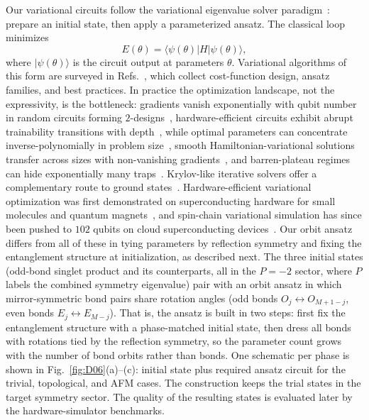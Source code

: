 Our variational circuits follow the variational eigenvalue solver
paradigm~\cite{peruzzo2014variational}: prepare an initial state, then
apply a parameterized ansatz. The classical loop minimizes
\begin{equation}
E(\theta)=\langle\psi(\theta)|H|\psi(\theta)\rangle,
\end{equation}
where $|\psi(\theta)\rangle$ is the circuit output at parameters
$\theta$. Variational algorithms of this form are surveyed in
Refs.~\cite{cerezo2021variational,tilly2022variational}, which collect
cost-function design, ansatz families, and best practices.
In practice the optimization landscape, not the
expressivity, is the bottleneck: gradients vanish exponentially with
qubit number in random circuits forming
$2$-designs~\cite{mcclean2018barren}, hardware-efficient circuits exhibit
abrupt trainability transitions with depth~\cite{campos2021abrupt}, while
optimal parameters can concentrate inverse-polynomially in problem
size~\cite{akshay2021parameter}, smooth Hamiltonian-variational solutions
transfer across sizes with non-vanishing
gradients~\cite{mele2022avoiding}, and barren-plateau regimes can hide
exponentially many traps~\cite{nemkov2025barren}. Krylov-like iterative
solvers offer a complementary route to ground
states~\cite{bharti2021iterative}. Hardware-efficient variational
optimization was first demonstrated on superconducting hardware for
small molecules and quantum
magnets~\cite{kandala2017hardware}, and spin-chain variational simulation
has since been pushed to $102$ qubits on cloud superconducting
devices~\cite{yu2023simulating}. Our orbit ansatz differs from all of
these in tying parameters by reflection symmetry and fixing the
entanglement structure at initialization, as described next.
The three initial states (odd-bond singlet
product and its counterparts, all in the $P=-2$ sector, where $P$ labels
the combined symmetry eigenvalue) pair with an
orbit ansatz in which mirror-symmetric bond pairs share rotation angles
(odd bonds $O_j\leftrightarrow O_{M+1-j}$, even bonds
$E_j\leftrightarrow E_{M-j}$). That is, the ansatz is built in two steps:
first fix the entanglement structure with a phase-matched initial state,
then dress all bonds with rotations tied by the reflection symmetry, so
the parameter count grows with the number of bond orbits rather than
bonds. One schematic per phase is shown in Fig.~\ref{fig:D06}(a)--(c): initial state
plus required ansatz circuit for the trivial, topological, and
AFM cases.
The construction keeps the trial states in the target symmetry sector.
The quality of the resulting states is evaluated later by the
hardware-simulator benchmarks.

